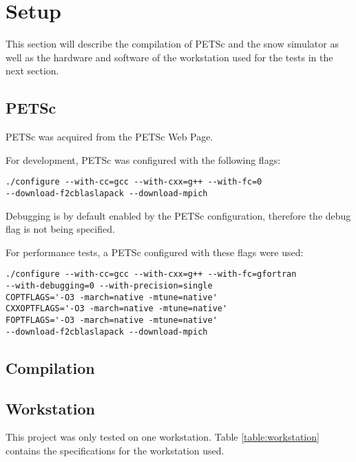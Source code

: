 \section{Setup}

This section will describe the compilation of PETSc and the snow simulator as well 
as the hardware and software of the workstation used for the tests in the next section. 

\subsection{PETSc}

PETSc was acquired from the PETSc Web Page\cite{petsc-web-page}. 

For development, PETSc was configured with the following flags:
\lstset{language=bash}
\begin{lstlisting}
./configure --with-cc=gcc --with-cxx=g++ --with-fc=0 
--download-f2cblaslapack --download-mpich
\end{lstlisting}
Debugging is by default enabled by the PETSc configuration, therefore the debug 
flag is not being specified.

For performance tests, a PETSc configured with these flags were used:
\lstset{language=bash}
\begin{lstlisting}
./configure --with-cc=gcc --with-cxx=g++ --with-fc=gfortran 
--with-debugging=0 --with-precision=single
COPTFLAGS='-O3 -march=native -mtune=native' 
CXXOPTFLAGS='-O3 -march=native -mtune=native' 
FOPTFLAGS='-O3 -march=native -mtune=native' 
--download-f2cblaslapack --download-mpich
\end{lstlisting}

\subsection{Compilation}

\subsection{Workstation}

This project was only tested on one workstation. Table \ref{table:workstation} contains 
the specifications for the workstation used.


